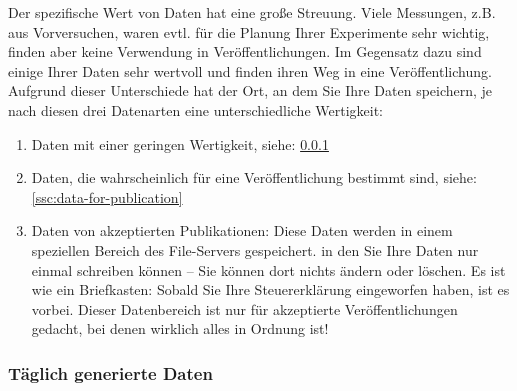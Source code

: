 Der spezifische Wert von Daten hat eine große Streuung. Viele Messungen,
z.B. aus Vorversuchen, waren evtl. für die Planung Ihrer Experimente sehr
wichtig, finden aber keine Verwendung in Veröffentlichungen. Im Gegensatz dazu
sind einige Ihrer Daten sehr wertvoll und finden ihren Weg in eine
Veröffentlichung. Aufgrund dieser Unterschiede hat der Ort, an dem Sie Ihre
Daten speichern, je nach diesen drei Datenarten eine unterschiedliche
Wertigkeit:
\begin{enumerate}[label=\Roman*.]
  \item Daten mit einer geringen Wertigkeit, siehe:
       \ref{ssc:daily-data} 
  \item Daten, die wahrscheinlich für eine Veröffentlichung bestimmt sind,
        siehe:
        \ref{ssc:data-for-publication} 
  \item Daten von akzeptierten Publikationen: Diese Daten werden in einem
        speziellen Bereich des File-Servers gespeichert. in den Sie Ihre Daten nur
        einmal schreiben können – Sie können dort nichts ändern oder löschen.
        Es ist wie ein Briefkasten: Sobald Sie Ihre Steuererklärung eingeworfen
        haben, ist es vorbei. Dieser Datenbereich ist nur für akzeptierte
        Veröffentlichungen gedacht, bei denen wirklich alles in Ordnung ist!
\end{enumerate}

\subsubsection{Täglich generierte Daten}\label{ssc:daily-data}

